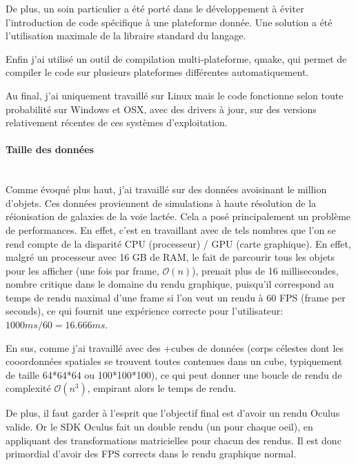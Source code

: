 \documentclass[a4paper,french,12pt]{article}
\begin{document}
		  De plus, un soin particulier a été porté dans le développement à éviter l'introduction
		  de code spécifique à une plateforme donnée. Une solution a été l'utilisation maximale de la libraire
		  standard du langage.

		  Enfin j'ai utilisé un outil de compilation multi-plateforme, qmake, qui permet de compiler le code
		  sur plusieurs plateformes différentes automatiquement.

		  Au final, j'ai uniquement travaillé sur Linux mais le code fonctionne selon toute probabilité sur
		  Windows et OSX, avec des drivers à jour, sur des versions relativement récentes de ces systèmes d'exploitation.

		\paragraph{Taille des données} ~\\

		  Comme évoqué plus haut, j'ai travaillé sur des données avoisinant le million d'objets.
		  Ces données proviennent de simulations à haute résolution de la réionisation de galaxies de la voie lactée.
		  Cela a posé
		  principalement un problème de performances. En effet, c'est en travaillant avec de tels nombres que
		  l'on se rend compte de la disparité CPU (processeur) / GPU (carte graphique).
		  En effet, malgré un processeur avec 16 GB de RAM, le fait de parcourir tous les objets pour les afficher (une fois par frame, $\mathcal{O}(n)$),
		  prenait plus de 16 millisecondes, nombre critique dans le domaine du rendu graphique, puisqu'il
		  correspond au temps de rendu maximal d'une frame si l'on veut un rendu à 60 FPS (frame per seconds),
		  ce qui fournit une expérience correcte pour l'utilisateur: $1000 ms / 60 = 16.666 ms$.

		  En sus, comme j'ai travaillé avec des +cubes de données (corps célestes dont les cooordonnées spatiales se trouvent toutes
		  contenues dans un cube, typiquement de taille 64*64*64 ou 100*100*100), ce qui peut donner une boucle de rendu
		  de complexité $\mathcal{O}(n^3)$, empirant alors le temps de rendu.

		  De plus, il faut garder à l'esprit que l'objectif final est d'avoir un rendu Oculus valide. Or le
		  SDK Oculus fait un double rendu (un pour chaque oeil), en appliquant des transformations matricielles
		  pour chacun des rendus. Il est donc primordial d'avoir des FPS corrects dans le rendu graphique normal.
\end{document}
